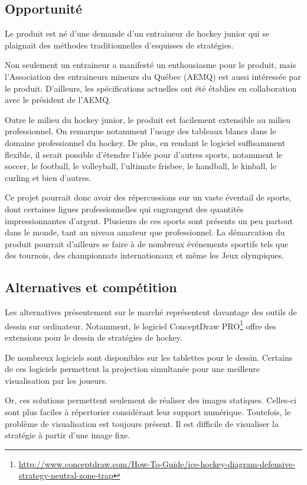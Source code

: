 \documentclass[ULlof]{ULrapport}
\begin{document}
\subsection{Opportunité}
Le produit est né d'une demande d'un entraineur de hockey junior qui se plaignait des méthodes traditionnelles d'esquisses de stratégies.

Non seulement un entraineur a manifesté un enthousiasme pour le produit, mais l'Association des entraineurs mineurs du Québec (AEMQ) est aussi intéressée par le produit. D'ailleurs, les spécifications actuelles ont été établies en collaboration avec le président de l'AEMQ.

Outre le milieu du hockey junior, le produit est facilement extensible au milieu professionnel. On remarque notamment l'usage des tableaux blancs dans le domaine professionnel du hockey. De plus, en rendant le logiciel suffisamment flexible, il serait possible d'étendre l'idée pour d'autres sports, notamment le soccer, le football, le volleyball, l'ultimate frisbee, le handball, le kinball, le curling et bien d'autres.

Ce projet pourrait donc avoir des répercussions sur un vaste éventail de sports, dont certaines ligues professionnelles qui engrangent des quantités impressionnantes d'argent. Plusieurs de ces sports sont présents un peu partout dans le monde, tant au niveau amateur que professionnel. La démarcation du produit pourrait d'ailleurs se faire à de nombreux événements sportifs tels que des tournois, des championnats internationaux et même les Jeux olympiques.

\subsection{Alternatives et compétition}
Les alternatives présentement sur le marché représentent davantage des outils de dessin sur ordinateur. Notamment, le logiciel ConceptDraw PRO\footnote{\url{http://www.conceptdraw.com/How-To-Guide/ice-hockey-diagram-defensive-strategy-neutral-zone-trap}} offre des extensions pour le dessin de stratégies de hockey.

De nombreux logiciels sont disponibles sur les tablettes pour le dessin. Certains de ces logiciels permettent la projection simultanée pour une meilleure visualisation par les joueurs.

Or, ces solutions permettent seulement de réaliser des images statiques. Celles-ci sont plus faciles à répertorier considérant leur support numérique. Toutefois, le problème de visualisation est toujours présent. Il est difficile de visualiser la stratégie à partir d'une image fixe.
\end{document}
